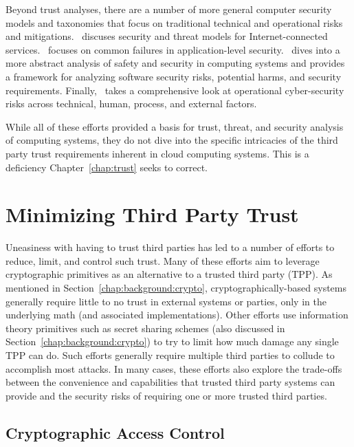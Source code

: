 Beyond trust analyses, there are a number of more general computer
security models and taxonomies that focus on traditional technical and
operational risks and mitigations. \cite{abbas2005}~discuses security
and threat models for Internet-connected services.
\cite{tsipenyuk2005}~focuses on common failures in application-level
security. \cite{firesmith2005}~dives into a more abstract analysis of
safety and security in computing systems and provides a framework for
analyzing software security risks, potential harms, and security
requirements. Finally, \cite{cebula2010}~takes a comprehensive look at
operational cyber-security risks across technical, human, process, and
external factors.

While all of these efforts provided a basis for trust, threat, and
security analysis of computing systems, they do not dive into the
specific intricacies of the third party trust requirements inherent in
cloud computing systems. This is a deficiency Chapter~\ref{chap:trust}
seeks to correct.

\section{Minimizing Third Party Trust}
\label{chap:related:minimize}

Uneasiness with having to trust third parties has led to a number of
efforts to reduce, limit, and control such trust. Many of these
efforts aim to leverage cryptographic primitives as an alternative to
a trusted third party (TPP). As mentioned in
Section~\ref{chap:background:crypto}, cryptographically-based systems
generally require little to no trust in external systems or parties,
only in the underlying math (and associated implementations). Other
efforts use information theory primitives such as secret sharing
schemes (also discussed in Section~\ref{chap:background:crypto}) to
try to limit how much damage any single TPP can do. Such efforts
generally require multiple third parties to collude to accomplish most
attacks. In many cases, these efforts also explore the trade-offs
between the convenience and capabilities that trusted third party
systems can provide and the security risks of requiring one or more
trusted third parties.

\subsection{Cryptographic Access Control}

